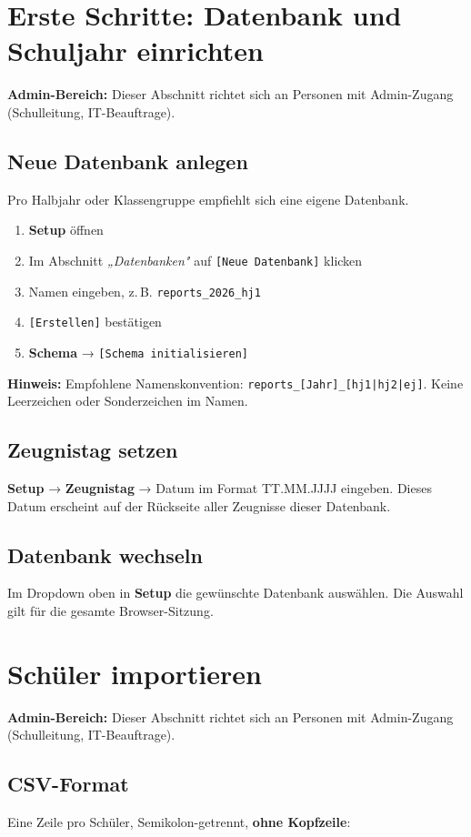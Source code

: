 \documentclass[12pt,a4paper]{article}
\newcommand{\info}[1]{\begin{infobox}\textbf{Hinweis:} #1\end{infobox}}
\newcommand{\adminonly}{\begin{adminbox}\textbf{Admin-Bereich:}
Dieser Abschnitt richtet sich an Personen mit Admin-Zugang (Schulleitung, IT-Beauftrage).\end{adminbox}}
\newcommand{\menu}[1]{\textbf{\textcolor{primary}{#1}}}
\newcommand{\key}[1]{\texttt{\small[#1]}}
\newcommand{\field}[1]{\textit{„#1"}}
\begin{document}
\section{Erste Schritte: Datenbank und Schuljahr einrichten}

\adminonly

\subsection{Neue Datenbank anlegen}
Pro Halbjahr oder Klassengruppe empfiehlt sich eine eigene Datenbank.

\begin{enumerate}[noitemsep]
  \item \menu{Setup} öffnen
  \item Im Abschnitt \field{Datenbanken} auf \key{Neue Datenbank} klicken
  \item Namen eingeben, z.\,B. \texttt{reports\_2026\_hj1}
  \item \key{Erstellen} bestätigen
  \item \menu{Schema} → \key{Schema initialisieren}
\end{enumerate}

\info{Empfohlene Namenskonvention: \texttt{reports\_[Jahr]\_[hj1|hj2|ej]}.
Keine Leerzeichen oder Sonderzeichen im Namen.}

\subsection{Zeugnistag setzen}
\menu{Setup} → \menu{Zeugnistag} → Datum im Format TT.MM.JJJJ eingeben.
Dieses Datum erscheint auf der Rückseite aller Zeugnisse dieser Datenbank.

\subsection{Datenbank wechseln}
Im Dropdown oben in \menu{Setup} die gewünschte Datenbank auswählen.
Die Auswahl gilt für die gesamte Browser-Sitzung.

\section{Schüler importieren}

\adminonly

\subsection{CSV-Format}
Eine Zeile pro Schüler, Semikolon-getrennt, \textbf{ohne Kopfzeile}:
\end{document}
